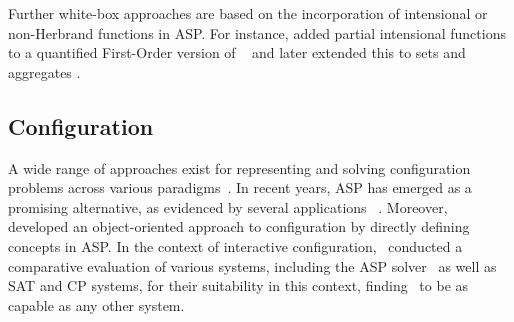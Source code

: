 Further white-box approaches are based on the incorporation of intensional or non-Herbrand functions in ASP.
For instance, \cite{cabalar11a} added partial intensional functions to a quantified First-Order version of \HT\ \cite{peaval04b} and
later extended this to sets and aggregates \cite{cafafape18a}.

\subsection{Configuration}
A wide range of approaches exist for representing and solving configuration problems
across various paradigms~\cite{junker06a,hofestrybawo14a}.
%
In recent years, ASP has emerged as a promising alternative,
as evidenced by several applications~%
\cite{%
    gekasc11c,%
    fefaateruraz17a,%
    gescer19a,%
    hebasasc22a%
}.
%
Moreover, \cite{faryscsh15a} developed an object-oriented approach to configuration by directly defining concepts in ASP.
%
In the context of interactive configuration,
\cite{fahakrscscta20a}~conducted a comparative evaluation of various systems,
including the ASP solver \clingo\ as well as SAT and CP systems,
for their suitability in this context, finding \clingo\ to be as capable as any other system.
